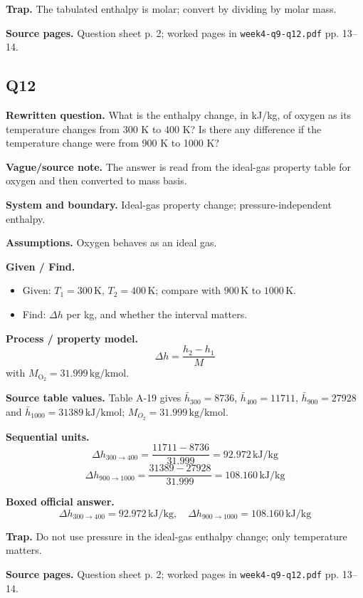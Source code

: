 \textbf{Trap.} The tabulated enthalpy is molar; convert by dividing by molar mass.

\textbf{Source pages.} Question sheet p. 2; worked pages in \texttt{week4-q9-q12.pdf} pp. 13--14.

\subsection*{Q12}
\textbf{Rewritten question.} What is the enthalpy change, in kJ/kg, of oxygen as its temperature changes from 300 K to 400 K? Is there any difference if the temperature change were from 900 K to 1000 K?

\textbf{Vague/source note.} The answer is read from the ideal-gas property table for oxygen and then converted to mass basis.

\textbf{System and boundary.} Ideal-gas property change; pressure-independent enthalpy.

\textbf{Assumptions.} Oxygen behaves as an ideal gas.

\textbf{Given / Find.}
\begin{itemize}
  \item Given: $T_1=300\,\text{K}$, $T_2=400\,\text{K}$; compare with $900\,\text{K}$ to $1000\,\text{K}$.
  \item Find: $\Delta h$ per kg, and whether the interval matters.
\end{itemize}

\textbf{Process / property model.}
\[
\Delta h = \frac{h_2-h_1}{M}
\]
with $M_{\mathrm{O_2}}=31.999\,\text{kg/kmol}$.

\textbf{Source table values.} Table A-19 gives $\bar h_{300}=8736$, $\bar h_{400}=11711$, $\bar h_{900}=27928$ and $\bar h_{1000}=31389\,\text{kJ/kmol}$; $M_{O_2}=31.999\,\text{kg/kmol}$.

\textbf{Sequential units.}
\[
 \Delta h_{300\to400}=\frac{11711-8736}{31.999}=92.972\,\text{kJ/kg}
\]
\[
 \Delta h_{900\to1000}=\frac{31389-27928}{31.999}=108.160\,\text{kJ/kg}
\]

\textbf{Boxed official answer.}
\[\boxed{\Delta h_{300\to400}=92.972\,\text{kJ/kg},\quad \Delta h_{900\to1000}=108.160\,\text{kJ/kg}}\]

\textbf{Trap.} Do not use pressure in the ideal-gas enthalpy change; only temperature matters.

\textbf{Source pages.} Question sheet p. 2; worked pages in \texttt{week4-q9-q12.pdf} pp. 13--14.
